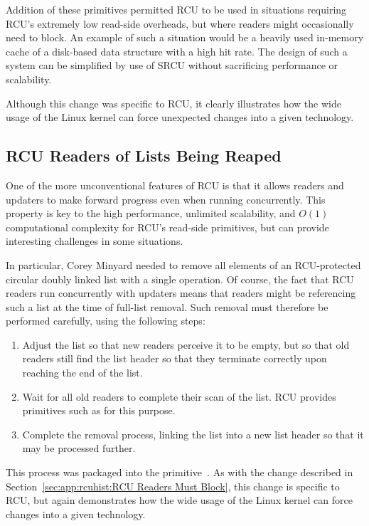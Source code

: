 Addition of these primitives permitted RCU to be used in situations
requiring RCU's extremely low read-side overheads, but where readers
might occasionally need to block.
An example of such a situation would be a heavily used in-memory cache
of a disk-based data structure with a high hit rate.
The design of such a system can be simplified by use of SRCU without
sacrificing performance or scalability.

Although this change was specific to RCU, it clearly illustrates how
the wide usage of the Linux kernel can force unexpected changes into
a given technology.

\subsection{RCU Readers of Lists Being Reaped}
\label{sec:app:rcuhist:RCU Readers of Lists Being Reaped}

One of the more unconventional features of RCU is that it allows
readers and updaters to make forward progress even when running
concurrently.
This property is key to the high performance, unlimited scalability,
and $O(1)$ computational complexity for RCU's read-side primitives,
but can provide interesting challenges in some situations.

In particular, Corey Minyard needed to remove all elements of an
RCU-protected circular doubly linked list with a single operation.
Of course, the fact that RCU readers run concurrently with updaters
means that readers might be referencing such a list at the time
of full-list removal.
Such removal must therefore be performed carefully, using the following
steps:

\begin{enumerate}
\item	Adjust the list so that new readers perceive it to be empty,
	but so that old readers still find the list header so that
	they terminate correctly upon reaching the end of the list.
\item	Wait for all old readers to complete their scan of the list.
	RCU provides primitives such as  for
	this purpose.
\item	Complete the removal process, linking the list into a new
	list header so that it may be processed further.
\end{enumerate}

This process was packaged into the 
primitive~\cite{CoreyMinyard2007list:splice:rcu}.
As with the change described in Section~\ref{sec:app:rcuhist:RCU Readers Must Block},
this change is specific to RCU, but again demonstrates how the wide
usage of the Linux kernel can force changes into a given technology.

